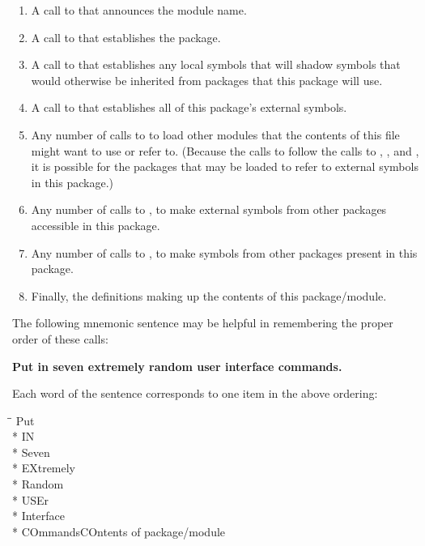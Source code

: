 \begin{enumerate}
\item
A call to  that announces the module name.

\item
A call to  that establishes the package.

\item
A call to  that establishes any local symbols that will shadow
symbols that would otherwise be inherited from packages that this
package will use.

\item
A call to  that establishes all of this package's external
symbols.

\item
Any number of calls to  to load other modules that the
contents of this file might want to use or refer to.  (Because the
calls to  follow the calls to ,
, and , it is possible for the packages that may
be loaded to refer to external symbols in this package.)

\item
Any number of calls to , to make external
symbols from other packages accessible in this package.

\item
Any number of calls to , to make
symbols from other packages present in this package.

\item
Finally, the definitions making up the contents of this package/module.
\end{enumerate}

The following mnemonic sentence may be helpful in remembering
the proper order of these calls:
\begin{center}
{\bf Put in seven extremely random user interface commands.}
\end{center}
Each word of the sentence corresponds to one item in the above ordering:
\begin{tabbing}
\hskip 6pc\=\hskip 8pc\=\kill
\>Put\> \\*
\>IN\> \\*
\>Seven\> \\*
\>EXtremely\> \\*
\>Random\> \\*
\>USEr\> \\*
\>Interface\> \\*
\>COmmands\>COntents of package/module
\end{tabbing}


